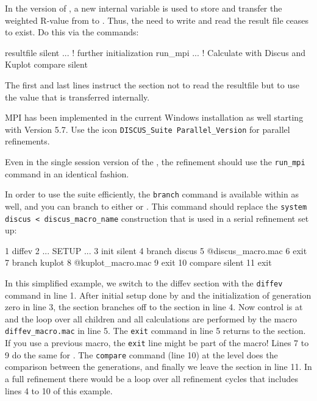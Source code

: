 In the \Suite version of \kuplot, a new internal variable is used to store
and transfer the weighted R-value from \Kuplot to \diffev. Thus, the need
to write and read the result file ceases to exist. Do this via the commands:

\begin{MacVerbatim}
resultfile  silent
...                ! further initialization
run_mpi ...        ! Calculate with Discus and Kuplot
compare silent
\end{MacVerbatim}

The first and last lines instruct the \Diffev section not to read the 
resultfile but to use the value that is transferred internally.

MPI has been implemented in the current Windows installation as well
starting with Version 5.7.
Use the icon {\tt DISCUS\_Suite Parallel\_Version} for parallel 
refinements. 

Even in the single session version of  the \suite, the refinement
should use the {\tt run\_mpi} command in an identical fashion.

In order to use the suite efficiently, the 
{\tt branch} command is available within \diffev as well, and you
can branch to either \discus or \Kuplot. This command should replace the 
{\tt system discus < discus\_macro\_name} construction that is used in a
serial refinement set up:


\begin{MacVerbatim}
   1  diffev
   2     ... SETUP ...
   3     init silent
   4     branch discus
   5        @discus_macro.mac
   6        exit
   7     branch kuplot
   8        @kuplot_macro.mac
   9        exit
  10     compare silent
  11  exit
\end{MacVerbatim}

In this simplified example, we switch to the diffev section with 
the {\tt diffev} command in line 1. After initial setup done by 
\Diffev and the initialization of generation zero in line 3, 
the \Diffev section branches off to the \Discus section in line 4.
Now control is at \Discus and the loop over all children and all
calculations are performed by the macro {\tt diffev\_macro.mac} in 
line 5. The {\tt exit} command in line 5 returns to the \Diffev section. 
If you use a previous \Discus macro, the {\tt exit} line might 
be part of the \Discus macro! Lines 7 to 9 do the same for 
\kuplot. The {\tt compare} command (line 10) at the \Diffev level does 
the comparison between the generations, and finally we leave the 
\Diffev section in line 11. In a full refinement there would be a loop 
over all refinement cycles that includes lines 4 to 10 of this example.

